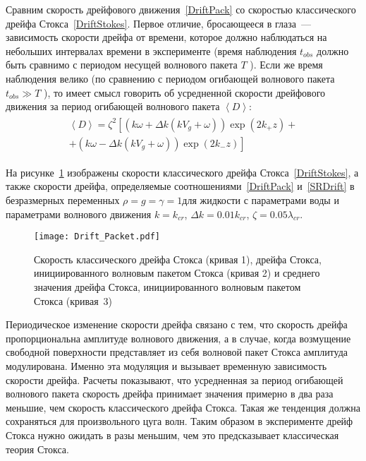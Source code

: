Сравним скорость дрейфового движения~\eqref{DriftPack} со скоростью классического дрейфа Стокса~\eqref{DriftStokes}. Первое отличие, бросающееся в глаза~--- зависимость скорости дрейфа  от времени, которое должно наблюдаться на небольших интервалах времени в эксперименте (время наблюдения $ t_{obs} $  должно быть сравнимо с периодом несущей волнового пакета $ T $ ). Если же время наблюдения велико (по сравнению с периодом огибающей волнового пакета $ t_{obs}\gg T $ ), то имеет смысл говорить об усредненной скорости дрейфового движения за период огибающей волнового пакета  $ \left\langle D \right\rangle   $:
\begin{gather}
\begin{gathered}
 \left\langle D\right\rangle  = \zeta^{2}\left[ \left( k \omega + \Delta k \left( k V_{g} + \omega \right) \right) \exp \left( 2 k_{+} z \right) + \right. \\
 \left. + \left( k \omega - \Delta k \left( k V_{g} + \omega \right) \right) \exp \left( 2 k_{-} z \right) \right]
 \label{SRDrift}
 \end{gathered}
\end{gather}
	  	
На рисунке~\ref{fig:Drift} изображены скорости классического дрейфа Стокса~\eqref{DriftStokes}, а также скорости дрейфа, определяемые соотношениями~\eqref{DriftPack} и~\eqref{SRDrift} в безразмерных переменных $ \rho=g=\gamma=1 $для жидкости с параметрами воды и параметрами волнового движения $ k=k_{cr} $, $ \Delta k= 0.01 k_{cr} $, $ \zeta=0.05 \lambda_{cr} $.
\begin{figure}[h]
\centering
\texttt{[image: Drift\_Packet.pdf]}
\caption{Скорость классического дрейфа Стокса (кривая 1), дрейфа Стокса, инициированного волновым пакетом Стокса (кривая 2) и среднего значения дрейфа Стокса, инициированного волновым пакетом Стокса (кривая~3)}\label{fig:Drift}
\end{figure}
Периодическое изменение скорости дрейфа связано с тем, что скорость дрейфа пропорциональна амплитуде волнового движения, а в случае, когда возмущение свободной поверхности представляет из себя волновой пакет Стокса амплитуда модулирована. Именно эта модуляция и вызывает временную зависимость скорости дрейфа. Расчеты показывают, что усредненная за период огибающей волнового пакета скорость дрейфа  принимает значения примерно в два раза меньшие, чем скорость классического дрейфа Стокса. Такая же тенденция должна сохраняться для произвольного цуга волн. Таким образом в эксперименте дрейф Стокса нужно ожидать в разы меньшим, чем это предсказывает классическая теория Стокса.


